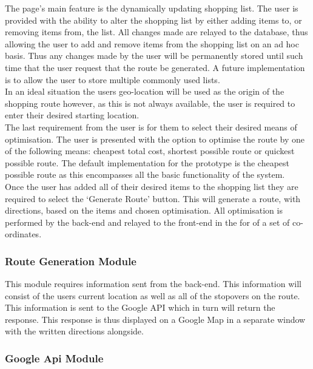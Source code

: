 \documentclass[10pt,twocolumn]{witseiepaper}
\begin{document}
		The page's main feature is the dynamically updating shopping list. The user is provided with the ability to alter the shopping list by either adding items to, or removing items from, the list. All changes made are relayed to the database, thus allowing the user to add and remove items from the shopping list on an ad hoc basis. Thus any changes made by the user will be permanently stored until such time that the user request that the route be generated. A future implementation is to allow the user to store multiple commonly used lists. \\
		
		In an ideal situation the users geo-location will be used as the origin of the shopping route however, as this is not always available, the user is required to enter their desired starting location.\\
		
		The last requirement from the user is for them to select their desired means of optimisation. The user is presented with the option to optimise the route by one of the following means: cheapest total cost, shortest possible route or quickest possible route. The default implementation for the prototype is the cheapest possible route as this encompasses all the basic functionality of the system. \\
		
		Once the user has added all of their desired items to the shopping list they are required to select the `Generate Route' button. This will generate a route, with directions, based on the items and chosen optimisation. All optimisation is performed by the back-end and relayed to the front-end in the for of a set of co-ordinates.
		
		\subsubsection{Route Generation Module}
		
		This module requires information sent from the back-end. This information will consist of the users current location as well as all of the stopovers on the route. This information is sent to the Google API which in turn will return the response. This response is thus displayed on a Google Map in a separate window with the written directions alongside.
		
		\subsubsection{Google Api Module}
		
\end{document}
